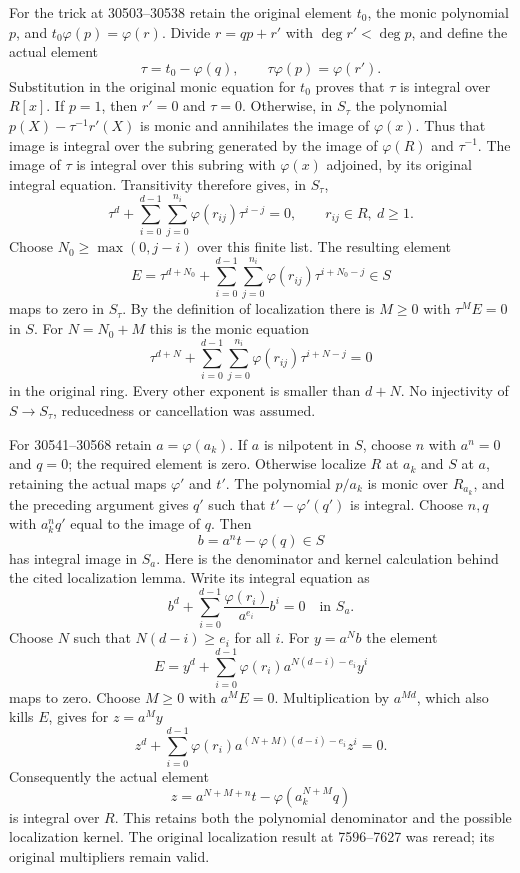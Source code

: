 For the trick at 30503--30538 retain the original element \(t_0\), the monic polynomial \(p\), and \(t_0\varphi(p)=\varphi(r)\). Divide \(r=qp+r'\) with \(\deg r'<\deg p\), and define the actual element \[
 \tau=t_0-\varphi(q),\qquad \tau\varphi(p)=\varphi(r').
\] Substitution in the original monic equation for \(t_0\) proves that \(\tau\) is integral over \(R[x]\). If \(p=1\), then \(r'=0\) and \(\tau=0\). Otherwise, in \(S_\tau\) the polynomial \(p(X)-\tau^{-1}r'(X)\) is monic and annihilates the image of \(\varphi(x)\). Thus that image is integral over the subring generated by the image of \(\varphi(R)\) and \(\tau^{-1}\). The image of \(\tau\) is integral over this subring with \(\varphi(x)\) adjoined, by its original integral equation. Transitivity therefore gives, in \(S_\tau\), \[
 \tau^d+\sum_{i=0}^{d-1}\sum_{j=0}^{n_i}
               \varphi(r_{ij})\tau^{i-j}=0,\qquad r_{ij}\in R,\ d\geq1.
\] Choose \(N_0\geq\max(0,j-i)\) over this finite list. The resulting element \[
 E=\tau^{d+N_0}+
       \sum_{i=0}^{d-1}\sum_{j=0}^{n_i}
             \varphi(r_{ij})\tau^{i+N_0-j}\in S
\] maps to zero in \(S_\tau\). By the definition of localization there is \(M\geq0\) with \(\tau^M E=0\) in \(S\). For \(N=N_0+M\) this is the monic equation \[
 \tau^{d+N}+\sum_{i=0}^{d-1}\sum_{j=0}^{n_i}
                \varphi(r_{ij})\tau^{i+N-j}=0
\] in the original ring. Every other exponent is smaller than \(d+N\). No injectivity of \(S\to S_\tau\), reducedness or cancellation was assumed.

For 30541--30568 retain \(a=\varphi(a_k)\). If \(a\) is nilpotent in \(S\), choose \(n\) with \(a^n=0\) and \(q=0\); the required element is zero. Otherwise localize \(R\) at \(a_k\) and \(S\) at \(a\), retaining the actual maps \(\varphi'\) and \(t'\). The polynomial \(p/a_k\) is monic over \(R_{a_k}\), and the preceding argument gives \(q'\) such that \(t'-\varphi'(q')\) is integral. Choose \(n,q\) with \(a_k^n q'\) equal to the image of \(q\). Then \[
 b=a^n t-\varphi(q)\in S
\] has integral image in \(S_a\). Here is the denominator and kernel calculation behind the cited localization lemma. Write its integral equation as \[
 b^d+\sum_{i=0}^{d-1}\frac{\varphi(r_i)}{a^{e_i}}b^i=0
 \quad\text{in }S_a.
\] Choose \(N\) such that \(N(d-i)\geq e_i\) for all \(i\). For \(y=a^N b\) the element \[
 E=y^d+\sum_{i=0}^{d-1}\varphi(r_i)a^{N(d-i)-e_i}y^i
\] maps to zero. Choose \(M\geq0\) with \(a^M E=0\). Multiplication by \(a^{Md}\), which also kills \(E\), gives for \(z=a^M y\) \[
 z^d+\sum_{i=0}^{d-1}\varphi(r_i)a^{(N+M)(d-i)-e_i}z^i=0.
\] Consequently the actual element \[
 z=a^{N+M+n}t-\varphi(a_k^{N+M}q)
\] is integral over \(R\). This retains both the polynomial denominator and the possible localization kernel. The original localization result at 7596--7627 was reread; its original multipliers remain valid.

